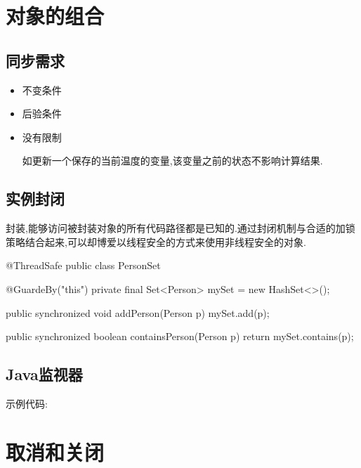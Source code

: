 \section{对象的组合}


\subsection{同步需求}

\begin{itemize}

\item 不变条件

\item 后验条件

\item 没有限制

如更新一个保存的当前温度的变量,该变量之前的状态不影响计算结果.

\end{itemize}


\subsection{实例封闭}

封装,能够访问被封装对象的所有代码路径都是已知的.通过封闭机制与合适的加锁策略结合起来,可以却博爱以线程安全的方式来使用非线程安全的对象.

\begin{Java}
@ThreadSafe
public class PersonSet {

	@GuardeBy("this")
	private final Set<Person> mySet = new HashSet<>();
	
	public synchronized void addPerson(Person p)
	{
		mySet.add(p);
	}
	
	public synchronized boolean containsPerson(Person p)
	{
		return mySet.contains(p);
	}
}
\end{Java}


\subsection{Java监视器}


示例代码:


\begin{Java}



\end{Java}




\section{取消和关闭}

